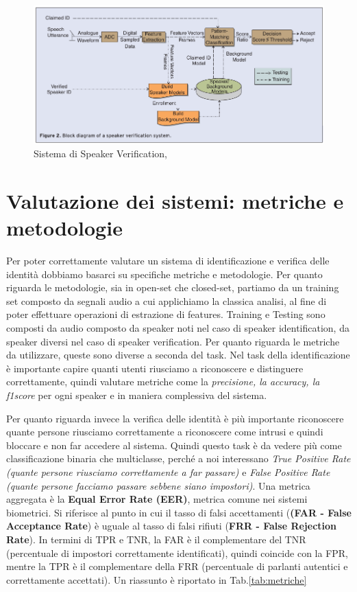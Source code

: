 \begin{figure}[ht]
    \centering
    \includegraphics[width=1.0\textwidth]{./ch1/speaker_ver.png}
    \caption{Sistema di Speaker Verification, \protect\cite{togneri2011overview}}
    \label{fig:speakerschemaver}
\end{figure}

\section{Valutazione dei sistemi: metriche e metodologie}
Per poter correttamente valutare un sistema di identificazione e verifica delle identità dobbiamo basarci su specifiche metriche e metodologie.
Per quanto riguarda le metodologie, sia in open-set che closed-set, partiamo da un training set composto da segnali audio a cui applichiamo la classica analisi,
al fine di poter effettuare operazioni di estrazione di features. Training e Testing sono composti da audio composto da speaker noti nel caso di speaker identification, da speaker diversi nel caso di speaker verification.
Per quanto riguarda le metriche da utilizzare, queste sono diverse a seconda del task. Nel task della identificazione è importante capire quanti utenti riusciamo a riconoscere
e distinguere correttamente, quindi valutare metriche come la \textit{precisione, la accuracy, la f1score} per ogni speaker e in maniera complessiva del sistema. 

Per quanto riguarda invece la verifica delle identità è più importante riconoscere quante persone riusciamo correttamente a riconoscere come intrusi e quindi bloccare e non far accedere al sistema. 
Quindi questo task è da vedere più come classificazione binaria che multiclasse, perché a noi interessano \textit{True Positive Rate (quante persone riusciamo correttamente a far passare)} e \textit{False Positive Rate (quante persone facciamo passare sebbene siano impostori)}.
Una metrica aggregata è la \textbf{Equal Error Rate (EER)}, metrica comune nei sistemi biometrici. Si riferisce al punto in cui il tasso di falsi accettamenti (\textbf{(FAR - False Acceptance Rate}) è uguale al tasso di falsi rifiuti (\textbf{FRR - False Rejection Rate}). 
In termini di TPR e TNR, la FAR è il complementare del TNR (percentuale di impostori correttamente identificati), quindi coincide con la FPR, mentre la TPR è il complementare della FRR (percentuale di parlanti autentici e correttamente accettati).
Un riassunto è riportato in Tab.\ref{tab:metriche}

